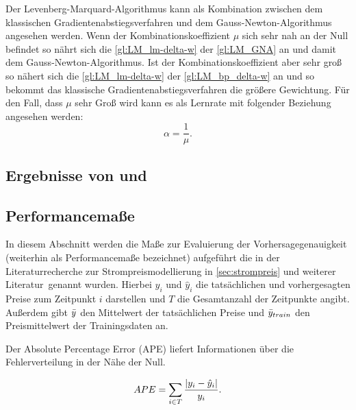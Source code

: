 Der Levenberg-Marquard-Algorithmus kann als Kombination zwischen dem klassischen Gradientenabstiegsverfahren und dem Gauss-Newton-Algorithmus angesehen werden. Wenn der Kombinationskoeffizient $\mu$ sich sehr nah an der Null befindet so nährt sich die \autoref{gl:LM_lm-delta-w} der \autoref{gl:LM_GNA} an und damit dem Gauss-Newton-Algorithmus. Ist der Kombinationskoeffizient aber sehr groß so nähert sich die \autoref{gl:LM_lm-delta-w} der \autoref{gl:LM_bp_delta-w} an und so bekommt das klassische Gradientenabstiegsverfahren die größere Gewichtung. Für den Fall, dass $\mu$ sehr Groß wird kann es als Lernrate mit folgender Beziehung angesehen werden:\,
\begin{equation}
\alpha = \frac{1}{\mu}.
\label{gl:LM_lernrate}
\end{equation}
 

\subsection{Ergebnisse von \citet{Aggarwal2009} und \citet{Panapakidis2016}}\label{sec:andere_ergebnisse}



\subsection{Performancemaße}\label{sec:perfmas}
In diesem Abschnitt werden die Maße zur Evaluierung der Vorhersagegenauigkeit (weiterhin als Performancemaße bezeichnet) aufgeführt die in der Literaturrecherche zur Strompreismodellierung in \autoref{sec:strompreis} und weiterer Literatur\, genannt wurden. Hierbei $y_i$ und $\hat{y}_i$ die tatsächlichen und vorhergesagten Preise zum Zeitpunkt $i$ darstellen und $T$ die Gesamtanzahl der Zeitpunkte angibt. Außerdem gibt $\bar{y}$ den Mittelwert der tatsächlichen Preise und $\bar{y}_{train}$ den Preismittelwert der Trainingsdaten an.

Der Absolute Percentage Error (APE) liefert Informationen über die Fehlerverteilung in der Nähe der Null.\,

\begin{equation}
APE= \sum\limits_{i \in T} \frac{\abs{y_i-\hat{y}_i}}{y_i}.
\label{gl:APE}
\end{equation}


